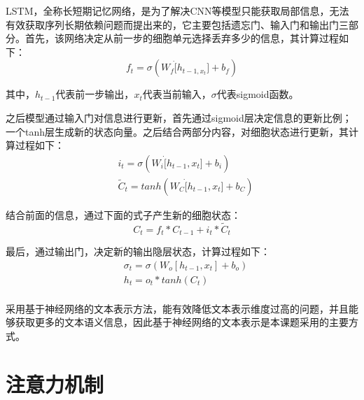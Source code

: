 LSTM，全称长短期记忆网络，是为了解决CNN等模型只能获取局部信息，无法有效获取序列长期依赖问题而提出来的，它主要包括遗忘门、输入门和输出门三部分。首先，该网络决定从前一步的细胞单元选择丢弃多少的信息，其计算过程如下：
\begin{equation}
    f_t = \sigma(W_f\dot[h_{t-1,x_t}] + b_f)
\end{equation}

其中，$h_{t-1}$代表前一步输出，$x_t$代表当前输入，$\sigma$代表sigmoid函数。

之后模型通过输入门对信息进行更新，首先通过sigmoid层决定信息的更新比例；一个tanh层生成新的状态向量。之后结合两部分内容，对细胞状态进行更新，其计算过程如下：
\begin{equation}
    \begin{aligned}
        & i_t = \sigma(W_i\dot[h_{t-1},x_t]+b_i) \\
        & \tilde{C}_t=tanh(W_C\dot[h_{t-1},x_t]+b_C)
    \end{aligned}
\end{equation}

结合前面的信息，通过下面的式子产生新的细胞状态：
\begin{equation}
    C_t=f_t*C_{t-1}+i_t*\tilde{C}_t
\end{equation}

最后，通过输出门，决定新的输出隐层状态，计算过程如下：
\begin{equation}
    \begin{aligned}
        & \sigma_t=\sigma(W_o[h_{t-1},x_t]+b_o) \\
        & h_t=o_t*tanh(C_t)\\
    \end{aligned}
\end{equation}

采用基于神经网络的文本表示方法，能有效降低文本表示维度过高的问题，并且能够获取更多的文本语义信息，因此基于神经网络的文本表示是本课题采用的主要方式。

\section{注意力机制}

